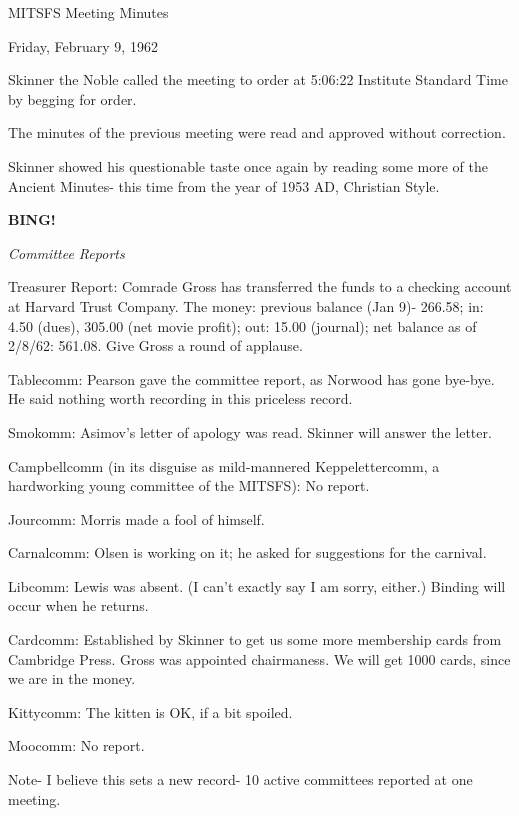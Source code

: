 \documentclass[12pt]{article}
\newcommand{\bing}{{\bf BING!} }
\newcommand{\goto}[1]{\bing \vskip 12pt \centerline{{\em{#1}}}}
\begin{document}
\begin{center}

MITSFS Meeting Minutes

Friday, February 9, 1962

\end{center}
 
\vspace{12pt}

\setlength{\parskip}{6pt}

\noindent
Skinner the Noble called the meeting to order at 5:06:22 Institute Standard Time by begging for order.

The minutes of the previous meeting were read and approved without correction.

Skinner showed his questionable taste once again by reading some more of the Ancient Minutes- this time from the year of 1953 AD, Christian Style.

\goto{Committee Reports}

Treasurer Report: Comrade Gross has transferred the funds to a checking account at Harvard Trust Company. The money: previous balance (Jan 9)- 266.58; in: 4.50 (dues), 305.00 (net movie profit); out: 15.00 (journal); net balance as of 2/8/62: 561.08. Give Gross a round of applause.

Tablecomm: Pearson gave the committee report, as Norwood has gone bye-bye. He said nothing worth recording in this priceless record.

Smokomm: Asimov's letter of apology was read. Skinner will answer the letter.

Campbellcomm (in its disguise as mild-mannered Keppelettercomm, a hardworking young committee of the MITSFS): No report.

Jourcomm: Morris made a fool of himself.

Carnalcomm: Olsen is working on it; he asked for suggestions for the carnival.

Libcomm: Lewis was absent. (I can't exactly say I am sorry, either.) Binding will occur when he returns.

Cardcomm: Established by Skinner to get us some more membership cards from Cambridge Press. Gross was appointed chairmaness. We will get 1000 cards, since we are in the money.

Kittycomm: The kitten is OK, if a bit spoiled.

Moocomm: No report.

Note- I believe this sets a new record- 10 active committees reported at one meeting.
\end{document}
